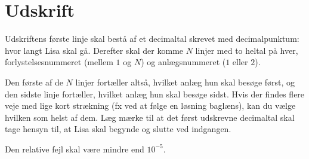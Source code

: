 \section*{Udskrift}
Udskriftens første linje skal bestå af et decimaltal skrevet med decimalpunktum: hvor langt Lisa skal gå. 
Derefter skal der komme $N$ linjer med to heltal på hver, forlystelsesnummeret (mellem $1$ og $N$) og anlægsnummeret ($1$ eller $2$).

Den første af de $N$ linjer fortæller altså, hvilket anlæg hun skal besøge først, og den sidste linje fortæller, hvilket anlæg hun skal besøge sidst.
Hvis der findes flere veje med lige kort strækning (fx ved at følge en løsning baglæns), kan du vælge hvilken som helst af dem.
Læg mærke til at det først udskrevne decimaltal skal tage hensyn til, at Lisa skal begynde og slutte ved indgangen.

Den relative fejl skal være mindre end $10^{-5}$.
